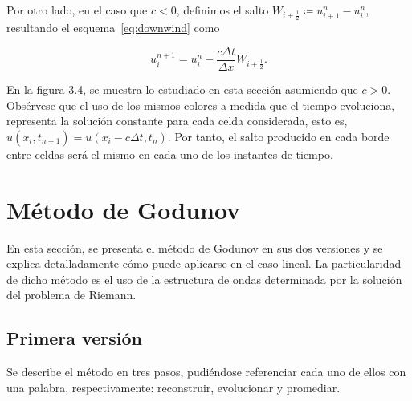 Por otro lado, en el caso que $c<0$, definimos el salto
$W_{i+\frac{1}{2}}\coloneqq u^{n}_{i+1}-u^{n}_{i}$, resultando el
esquema~\eqref{eq:downwind} como

\begin{equation*}
  u^{n+1}_{i}=
  u^{n}_{i}-
  \frac{c\Delta t}{\Delta x}
  W_{i+\frac{1}{2}}.
\end{equation*}

En la figura 3.4, se muestra lo estudiado en esta sección asumiendo
que $c>0$.
Obsérvese que el uso de los mismos colores a medida que el tiempo
evoluciona, representa la solución constante para cada celda
considerada, esto es,
\begin{math}
  u
  \left(
  x_{i},
  t_{n+1}
  \right)=
  u
  \left(
  x_{i}-c\Delta t,
  t_{n}
  \right)
\end{math}.
Por tanto, el salto producido en cada borde entre celdas será el
mismo en cada uno de los instantes de tiempo.

\section{Método de Godunov}

En esta sección, se presenta el método de Godunov en sus dos
versiones y se explica detalladamente cómo puede aplicarse en el
caso lineal.
La particularidad de dicho método es el uso de la estructura de ondas
determinada por la solución del problema de Riemann.

\subsection{Primera versión}

Se describe el método en tres pasos, pudiéndose referenciar cada uno
de ellos con una palabra, respectivamente: reconstruir, evolucionar
y promediar.

